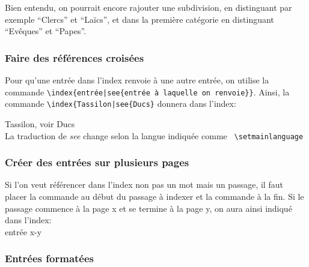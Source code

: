 Bien entendu, on pourrait encore rajouter une subdivision, en distinguant par exemple \enquote{Clercs} et \enquote{Laïcs}, et dans la première catégorie en distinguant \enquote{Evêques} et \enquote{Papes}. 

 
\subsubsection{Faire des références croisées}

Pour qu'une entrée dans l'index renvoie à une autre entrée, on utilise la commande  \verb+\index{entrée|see{entrée à laquelle on renvoie}}+. Ainsi, la commande \verb+\index{Tassilon|see{Ducs}+ donnera dans l'index:

Tassilon, voir Ducs\\
La traduction de \emph{see} change selon la langue indiquée comme \verb+ \setmainlanguage+



  

\subsubsection{Créer des entrées sur plusieurs pages}

Si l'on veut référencer dans l'index non pas un mot mais un passage, il faut placer la commande  au début du passage à indexer et la commande   à la fin. Si le passage commence à la page x et se termine à la page y, on aura ainsi indiqué dans l'index: \\
entrée x-y


\subsubsection{Entrées formatées}

